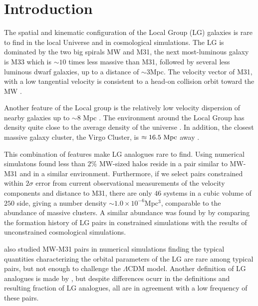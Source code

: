 \documentclass{emulateapj}
\newcommand{\lcdm}{$\Lambda$CDM }
\newcommand{\mpc}{\rm{Mpc}}
\newcommand{\hmpc}{{\ifmmode{h^{-1}{\rm Mpc}}\else{$h^{-1}$Mpc }\fi}}
\begin{document}
\section{Introduction}
\label{sec:intro}


The spatial and kinematic configuration of the Local Group
(LG) galaxies is rare to find in the local Universe and in cosmological
simulations. 
The LG is dominated by the two big spirals MW and M31, the next
most-luminous galaxy is M33 which is $\sim 10$ times less massive than
M31, followed by several less luminous dwarf galaxies, up to a
distance of $\sim 3$\mpc.   
The velocity vector of M31, with a low
tangential velocity is consistent to a head-on collision orbit toward
the MW
\citep{2008MNRAS.386..461C,2012ApJ...753....8V,2012ApJ...753....7S}.   

Another feature of the Local group is the relatively low velocity
dispersion of nearby galaxies up to $\sim 8$ Mpc \citep[][and
  references therein]{1975ApJ...196..313S,2011MNRAS.415L..16A}. 
The environment around the Local Group has density quite close to the
average density of the universe
\citep{2003ApJ...596...19K,2005AJ....129..178K}. 
In addition, the closest massive galaxy cluster, the Virgo Cluster, is
$\approx 16.5\ \mpc$ away \citep{2007ApJ...655..144M}.   

This combination of features make LG analogues rare to
find. 
Using numerical simulatons \citet{lganalogues} found less than
$2\%$ MW-sized halos reside in a pair similar to MW-M31 and in a
similar environment. 
Furthermore, if we select pairs constrained
within $2\sigma$ error from current observational measurements of the
velocity components and distance to M31, there are only $46$ systems
in a cubic volume of $250$ \hmpc side, giving a number density $\sim
1.0\times 10^{-6}$Mpc$^{3}$, comparable to the abundance of massive
clusters. 
A similar abundance was found by \cite{ForeroRomero2011} by comparing the
formation history of LG pairs in constrained simulations with the
results of unconstrained cosmological simulations.

\citet{2013ApJ...767L...5F} also studied MW-M31 pairs in numerical
simulations finding the typical quantities characterizing the orbital
parameters of the LG are rare among typical pairs, but not enough to
challenge the \lcdm model.  
Another definition of LG analogues is made
by \citet{2008MNRAS.384.1459L}, but despite differences ocurr in the
definitions and resulting fraction of LG analogues, all are in
agreement with a low frequency of these pairs.  
\end{document}
